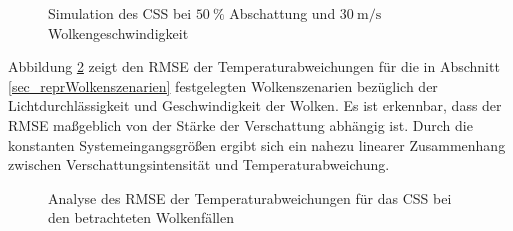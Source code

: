 \begin{figure}[h!]
    \centering
    \setlength{\fboxsep}{1pt}
    \setlength{\fboxrule}{1pt}
\caption[Simulation des CSS bei $\SI{50}{\percent}$ Abschattung und $\SI{30}{\metre\per\second}$ Wolkengeschwindigkeit]{Simulation des CSS bei $\SI{50}{\percent}$ Abschattung und $\SI{30}{\metre\per\second}$ Wolkengeschwindigkeit}
    \label{fig_cloudstandby5030}
\end{figure}

Abbildung \ref{fig_RMSEcloudstandby} zeigt den RMSE der Temperaturabweichungen für die in Abschnitt \ref{sec_reprWolkenszenarien} festgelegten Wolkenszenarien bezüglich der Lichtdurchlässigkeit und Geschwindigkeit der Wolken.
Es ist erkennbar, dass der RMSE maßgeblich von der Stärke der Verschattung abhängig ist.
Durch die konstanten Systemeingangsgrößen ergibt sich ein nahezu linearer Zusammenhang zwischen Verschattungsintensität und Temperaturabweichung.

\enlargethispage{2\baselineskip}
\begin{figure}[h!]
    \centering
    \setlength{\fboxsep}{1pt}
    \setlength{\fboxrule}{1pt}
\caption[Analyse des RMSE der Temperaturabweichungen für das CSS bei den betrachteten Wolkenfällen]{Analyse des RMSE der Temperaturabweichungen für das CSS bei den betrachteten Wolkenfällen}
    \label{fig_RMSEcloudstandby}
\end{figure}

